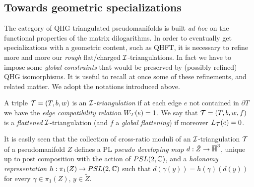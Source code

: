 \subsection{Towards geometric specializations}\label{ToGeoSpec} The
category of QHG triangulated pseudomanifolds is built {\it ad hoc}
on the functional properties of the matrix dilogarithms. In order
to eventually get specializations with a geometric content, such
as QHFT, it is necessary to refine more and more our {\it rough}
flat/charged ${\mathcal I}$-triangulations. In fact we have to impose some
{\it global constraints} that would be preserved by (possibly
refined) QHG isomorphisms.  It is useful to recall at once some of
these refinements, and related matter. We adopt the notations
introduced above.
\begin{defi}\label{non-rough}{\rm A triple ${\mathcal T}=(T,b,w)$ is an {\it
      ${\mathcal I}$-triangulation} if at each edge $e$ not contained in
    $\partial T$ we have the {\it edge compatibility relation}
    $W_{\mathcal T}(e)=1$.  We say that ${\mathcal T}=(T,b,w,f)$ is a {\it flattened}
    ${\mathcal I}$-triangulation (and $f$ a {\it global  flattening}) if moreover
    $L_{\mathcal T}(e)=0$.}
\end{defi}
It is easily seen that the collection of cross-ratio moduli of an
${\mathcal I}$-triangulation ${\mathcal T}$ of a pseudomanifold $Z$ defines a PL {\it
pseudo developing map} $d: \tilde{Z} \to \overline{\mathbb{H}}^3$, unique up to
post composition with the action of $PSL(2,{\mathbb C})$, and a {\it holonomy
representation} $h: \pi_1(Z) \to PSL(2,{\mathbb C})$ such that $d(\gamma(y)) =
h(\gamma)(d(y))$ for every $\gamma \in \pi_1(Z)$, $y\in \tilde{Z}$.

